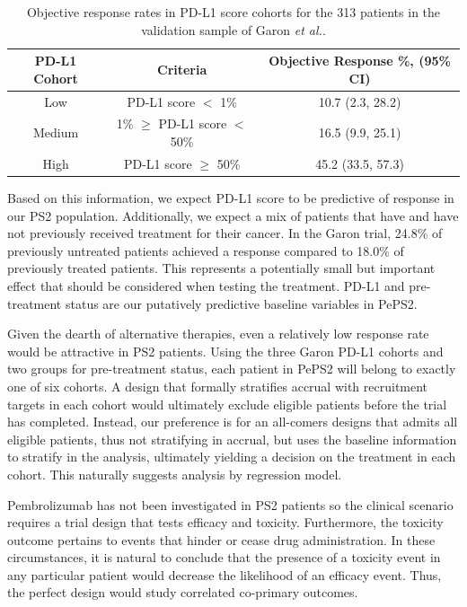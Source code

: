 \documentclass[alpha-refs]{wiley-article}
\begin{document}
\begin{table}[p]
	\centering
	\caption{Objective response rates in PD-L1 score cohorts for the 313 patients in the validation sample of Garon \textit{et al.}\cite{Garon2015}.}
	\label{tab:garon.efficacy}
	\begin{tabular}{|c | c | c |}
		\hline
		PD-L1 Cohort & Criteria & Objective Response \%, (95\% CI) \\ 
		\hline
		Low & PD-L1 score $<$ 1\% & 10.7 (2.3, 28.2) \\ 
		Medium & 1\% $\geq$ PD-L1 score $<$ 50\% & 16.5 (9.9, 25.1) \\ 
		High & PD-L1 score $\geq$ 50\% & 45.2 (33.5, 57.3)\\
		\hline
	\end{tabular}
\end{table}

Based on this information, we expect PD-L1 score to be predictive of response in our PS2 population.
Additionally, we expect a mix of patients that have and have not previously received treatment for their cancer.
In the Garon trial, 24.8\% of previously untreated patients achieved a response compared to 18.0\% of previously treated patients.
This represents a potentially small but important effect that should be considered when testing the treatment.
PD-L1 and pre-treatment status are our putatively predictive baseline variables in PePS2.

Given the dearth of alternative therapies, even a relatively low response rate would be attractive in PS2 patients.
Using the three Garon PD-L1 cohorts and two groups for pre-treatment status, each patient in PePS2 will belong to exactly one of six cohorts.
A design that formally stratifies accrual with recruitment targets in each cohort would ultimately exclude eligible patients before the trial has completed.
Instead, our preference is for an all-comers designs that admits all eligible patients, thus not stratifying in accrual, but uses the baseline information to stratify in the analysis, ultimately yielding a decision on the treatment in each cohort.
This naturally suggests analysis by regression model.

Pembrolizumab has not been investigated in PS2 patients so the clinical scenario requires a trial design that tests efficacy and toxicity.
Furthermore, the toxicity outcome pertains to events that hinder or cease drug administration.
In these circumstances, it is natural to conclude that the presence of a toxicity event in any particular patient would decrease the likelihood of an efficacy event.
Thus, the perfect design would study correlated co-primary outcomes.
\end{document}
